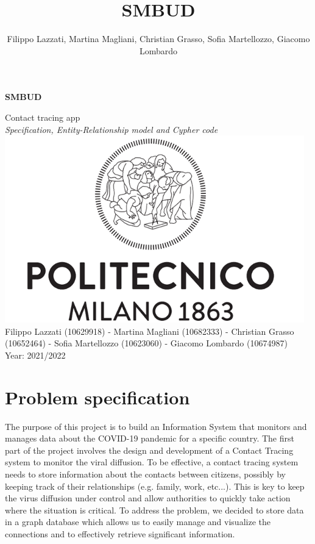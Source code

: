 \documentclass{article}
\title{SMBUD}
\author{Filippo Lazzati, Martina Magliani, Christian Grasso, Sofia Martellozzo, Giacomo Lombardo}
\begin{document}
\thispagestyle{empty}
\begin{titlepage}
    \begin{center}
       {\Huge \textbf{SMBUD}} %
       \vspace{0.5cm}
       \\
    \begin{LARGE}
        {Contact tracing app}
        \vspace{1.0cm}
        \\
        {\textit{Specification, Entity-Relationship model and Cypher code}}
           \includegraphics[width=13cm]{polimi.png}
          \vspace{1.5cm}\\
                  Filippo Lazzati (10629918) - Martina Magliani (10682333) - Christian Grasso (10652464) - Sofia Martellozzo (10623060) - Giacomo Lombardo (10674987)\\
       {Year: 2021/2022}
    \end{LARGE}  
   \end{center}
\end{titlepage}
\newpage
\tableofcontents %
\newpage
\section{Problem specification}
The purpose of this project is to build an Information System that monitors and manages data about the COVID-19 pandemic for a specific country.
The first part of the project involves the design and development of a Contact Tracing system to monitor the viral diffusion. To be effective, a contact tracing system needs to store information about the contacts between citizens, possibly by keeping track of their relationships (e.g. family, work, etc...). This is key to keep the virus diffusion under control and allow authorities to quickly take action where the situation is critical.
To address the problem, we decided to store data in a graph database which allows us to easily manage and visualize the connections and to effectively retrieve significant information.
\end{document}

